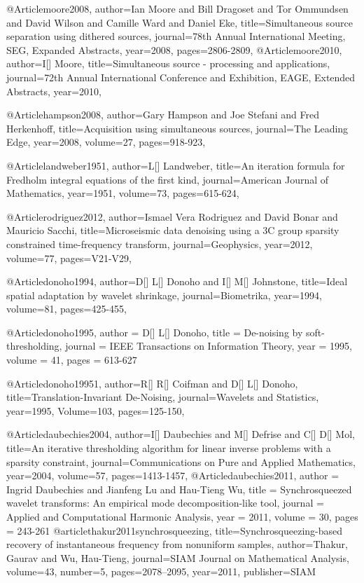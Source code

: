 @Article{moore2008,
  author={Ian Moore and Bill Dragoset and Tor Ommundsen and David Wilson and Camille Ward and Daniel Eke},
  title={Simultaneous source separation using dithered sources},
  journal={78th Annual International Meeting, SEG, Expanded Abstracts},
  year=2008,
  pages={2806-2809},
}
@Article{moore2010,
  author={I[] Moore},
  title={Simultaneous source - processing and applications},
  journal={72th Annual International Conference and Exhibition, EAGE, Extended Abstracts},
  year=2010,
}


@Article{hampson2008,
  author={Gary Hampson and Joe Stefani and Fred Herkenhoff},
  title={Acquisition using simultaneous sources},
  journal={The Leading Edge},
  year=2008,
  volume=27,
  pages={918-923},
}

@Article{landweber1951,
  author={L[] Landweber},
  title={An iteration formula for Fredholm integral equations of the first kind},
  journal={American Journal of Mathematics},
  year=1951,
  volume=73,
  pages={615-624},
}

@Article{rodriguez2012,
  author={Ismael Vera Rodriguez and David Bonar and Mauricio Sacchi},
  title={Microseismic data denoising using a 3C group sparsity constrained time-frequency transform},
  journal={Geophysics},
  year=2012,
  volume=77,
  pages={V21-V29},
}

@Article{donoho1994,
  author={D[] L[] Donoho and I[] M[] Johnstone},
  title={Ideal spatial adaptation by wavelet shrinkage},
  journal={Biometrika},
  year=1994,
  volume=81,
  pages={425-455},
}

@Article{donoho1995,
  author =  {D[] L[] Donoho},
  title =   {De-noising by soft-thresholding},
  journal = {IEEE Transactions on Information Theory},
  year =    {1995},
  volume =  {41},
  pages =   {613-627}
}


@Article{donoho19951,
  author={R[] R[] Coifman and D[] L[] Donoho},
  title={Translation-Invariant De-Noising},
  journal={Wavelets and Statistics},
  year=1995,
  Volume=103,
  pages={125-150},
}

@Article{daubechies2004,
  author={I[] Daubechies and M[] Defrise and C[] D[] Mol},
  title={An iterative thresholding algorithm for linear inverse problems with a sparsity constraint},
  journal={Communications on Pure and Applied Mathematics},
  year=2004,
  volume=57,
  pages={1413-1457},
}
@Article{daubechies2011,
  author = 	 {Ingrid Daubechies and Jianfeng Lu and Hau-Tieng Wu},
  title = 	 {Synchrosqueezed wavelet transforms: An empirical mode decomposition-like tool},
  journal = 	 {Applied and Computational Harmonic Analysis},
  year = 	 2011,
  volume = 	 30,
  pages = 	 {243-261}
}
@article{thakur2011synchrosqueezing,
  title={Synchrosqueezing-based recovery of instantaneous frequency from nonuniform samples},
  author={Thakur, Gaurav and Wu, Hau-Tieng},
  journal={SIAM Journal on Mathematical Analysis},
  volume={43},
  number={5},
  pages={2078--2095},
  year={2011},
  publisher={SIAM}
}


